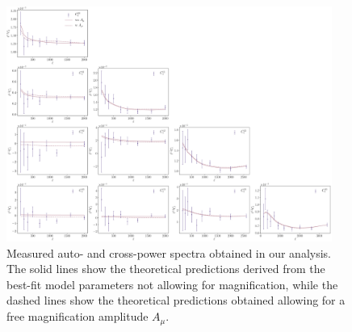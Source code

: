 \documentclass[a4paper,11pt]{article}
\begin{document}
      \begin{figure}
        \begin{center}
          \includegraphics[width=0.95\textwidth]{figures/Cls-data-vs-best-fit_mPk=HOD_fix=alpha-fc-sigmaM_HOD=zevol_fit=pz-shifts+prior=0p2-pz-widths+prior=0p2_fit=auto+cross_cosmo=const_cov=G+NG+SSC-LINBIAS_HOD-param=zfid_clfit=HOD-zevol_no-mag-vs-mag.pdf}
          \caption{Measured auto- and cross-power spectra obtained in our analysis. The solid lines show the theoretical predictions derived from the best-fit model parameters not allowing for magnification, while the dashed lines show the theoretical predictions obtained allowing for a free magnification amplitude $A_{\mu}$.}
          \label{fig:cls-best-fit}
        \end{center}
      \end{figure}
\end{document}

